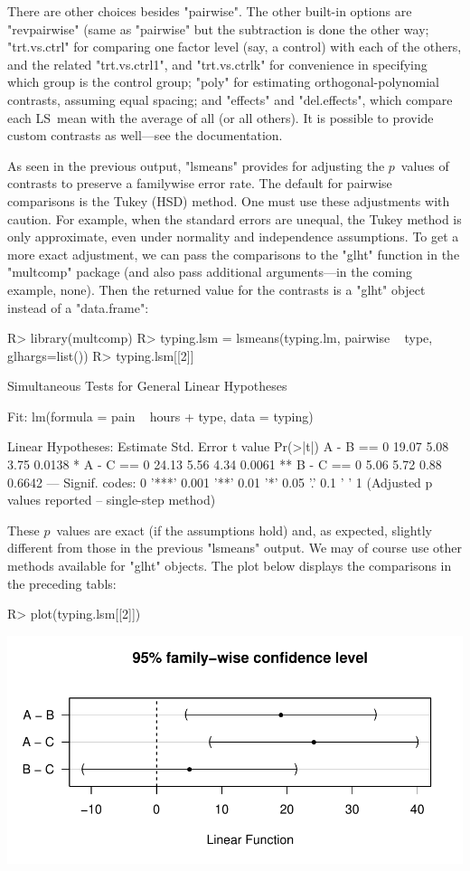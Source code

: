 \documentclass{article}
\begin{document}
There are other choices besides "pairwise". The other built-in options are "revpairwise" (same as "pairwise" but the subtraction is done the other way; "trt.vs.ctrl" for comparing one factor level (say, a control) with each of the others, and the related "trt.vs.ctrl1", and "trt.vs.ctrlk" for convenience in specifying which group is the control group; "poly" for estimating orthogonal-polynomial contrasts, assuming equal spacing; and "effects" and "del.effects", which compare each LS~mean with the average of all (or all others). It is possible to provide custom contrasts as well---see the documentation.

As seen in the previous output, "lsmeans" provides for adjusting the $p$~values of contrasts to preserve a familywise error rate. The default for pairwise comparisons is the Tukey (HSD) method. One must use these adjustments with caution. For example, when the standard errors are unequal, the Tukey method is only approximate, even under normality and independence assumptions. 
To get a more exact adjustment, we can pass the comparisons to the "glht" function in the "multcomp" package (and also pass additional arguments---in the coming example, none). Then the returned value for the contrasts is a "glht" object instead of a "data.frame":
\begin{Winput}
R> library(multcomp)
R> typing.lsm = lsmeans(typing.lm, pairwise ~ type, glhargs=list())
R> typing.lsm[[2]]
\end{Winput}
\begin{Woutput}
	 Simultaneous Tests for General Linear Hypotheses

Fit: lm(formula = pain ~ hours + type, data = typing)

Linear Hypotheses:
           Estimate Std. Error t value Pr(>|t|)
A - B == 0    19.07       5.08    3.75   0.0138 *
A - C == 0    24.13       5.56    4.34   0.0061 **
B - C == 0     5.06       5.72    0.88   0.6642
---
Signif. codes:  0 '***' 0.001 '**' 0.01 '*' 0.05 '.' 0.1 ' ' 1
(Adjusted p values reported -- single-step method)
\end{Woutput}
These $p$~values are exact (if the assumptions hold) and, as expected, slightly different from those in the previous "lsmeans" output. We may of course use other methods available for "glht" objects. The plot below displays the comparisons in the preceding tabls:
\begin{Winput}
R> plot(typing.lsm[[2]])
\end{Winput}
\includegraphics[scale=.6]{using-lsmeans-typing-glht-plot-fig.pdf}
\end{document}
